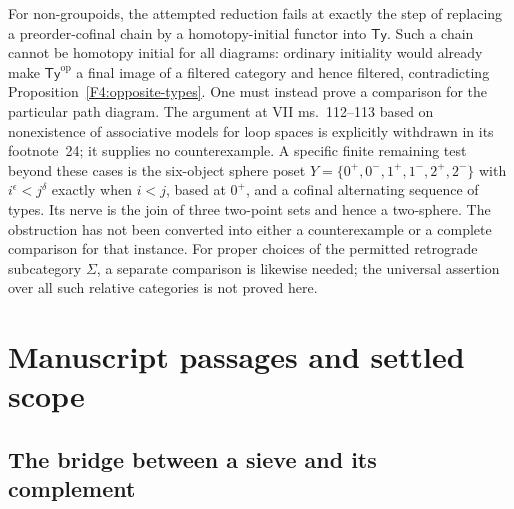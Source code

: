 \documentclass[11pt,a4paper]{article}
\theoremstyle{definition}
\theoremstyle{remark}
\begin{document}
For non-groupoids, the attempted reduction fails at exactly the step
of replacing a preorder-cofinal chain by a homotopy-initial functor
into $\mathsf{Ty}$.  Such a chain cannot be homotopy initial for all
diagrams: ordinary initiality would already make
$\mathsf{Ty}^{\mathrm{op}}$ a final image of a filtered category and
hence filtered, contradicting Proposition~\ref{F4:opposite-types}.
One must instead prove a comparison for the particular path diagram.
The argument at VII ms.~112--113 based on nonexistence of associative
models for loop spaces is explicitly withdrawn in its footnote~24;
it supplies no counterexample.  A specific finite remaining test
beyond these cases is the six-object sphere poset
$Y=\{0^+,0^-,1^+,1^-,2^+,2^-\}$ with $i^\epsilon<j^\delta$ exactly
when $i<j$, based at $0^+$, and a cofinal alternating sequence of
types.  Its nerve is the join of three two-point sets and hence a
two-sphere.  The obstruction has not been converted into either a
counterexample or a complete comparison for that instance.  For
proper choices of the permitted retrograde subcategory $\Sigma$, a
separate comparison is likewise needed; the universal assertion over
all such relative categories is not proved here.


\section{Manuscript passages and settled scope}

\subsection{The bridge between a sieve and its complement}
\end{document}
